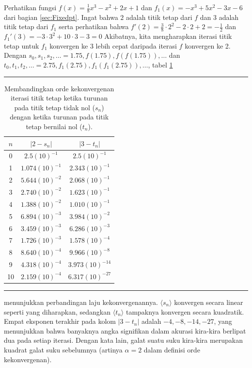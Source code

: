 Perhatikan fungsi $f(x)=\frac{1}{8}x^{3}-x^{2}+2x+1$ dan $f_{1}(x)=-x^{3}+5x^{2}-3x-6$
dari bagian \ref{sec:Fixedpt}. Ingat bahwa $2$ adalah titik tetap
dari $f$ dan $3$ adalah titik tetap dari $f_{1}$ serta perhatikan
bahwa $f'(2)=\frac{3}{8}\cdot2^{2}-2\cdot2+2=-\frac{1}{2}$ dan $f_{1}'(3)=-3\cdot3^{2}+10\cdot3-3=0$
Akibatnya, kita mengharapkan iterasi titik tetap untuk $f_{1}$ konvergen
ke 3 lebih cepat daripada iterasi $f$ konvergen ke 2. Dengan $s_{0},s_{1},s_{2},\ldots=1.75,f(1.75),f(f(1.75)),\ldots$
dan $t_{0},t_{1},t_{2},\ldots=2.75,f_{1}(2.75),f_{1}(f_{1}(2.75)),\ldots$,
tabel \ref{tab:fixedPointOrderComparison} 
\begin{table}[h]
\hrule \caption{\label{tab:fixedPointOrderComparison}Membandingkan orde kekonvergenan
iterasi titik tetap ketika turunan pada titik tetap tidak nol ($s_{n}$)
dengan ketika turunan pada titik tetap bernilai nol ($t_{n}$).}

\centering{}\medskip{}
\begin{tabular}{c|cc}
$n$ & $|2-s_{n}|$ & $|3-t_{n}|$\tabularnewline
\hline 
0 & $2.5(10)^{-1}$ & $2.5(10)^{-1}$\tabularnewline
1 & $1.074(10)^{-1}$ & $2.343(10)^{-1}$\tabularnewline
2 & $5.644(10)^{-2}$ & $2.068(10)^{-1}$\tabularnewline
3 & $2.740(10)^{-2}$ & $1.623(10)^{-1}$\tabularnewline
4 & $1.388(10)^{-2}$ & $1.010(10)^{-1}$\tabularnewline
5 & $6.894(10)^{-3}$ & $3.984(10)^{-2}$\tabularnewline
6 & $3.459(10)^{-3}$ & $6.286(10)^{-3}$\tabularnewline
7 & $1.726(10)^{-3}$ & $1.578(10)^{-4}$\tabularnewline
8 & $8.640(10)^{-4}$ & $9.966(10)^{-8}$\tabularnewline
9 & $4.318(10)^{-4}$ & $3.973(10)^{-14}$\tabularnewline
10 & $2.159(10)^{-4}$ & $6.317(10)^{-27}$\tabularnewline
\end{tabular}\medskip{}
\hrule 
\end{table}
menunjukkan perbandingan laju kekonvergenannya. $\langle s_{n}\rangle$
konvergen secara linear seperti yang diharapkan, sedangkan $\langle t_{n}\rangle$
tampaknya konvergen secara kuadratik. Empat eksponen terakhir pada
kolom $|3-t_{n}|$ adalah $-4,-8,-14,-27$, yang menunjukkan bahwa
banyaknya angka signifikan dalam akurasi kira-kira berlipat dua pada
setiap iterasi. Dengan kata lain, galat suatu suku kira-kira merupakan
kuadrat galat suku sebelumnya (artinya $\alpha=2$ dalam definisi
orde kekonvergenan).

